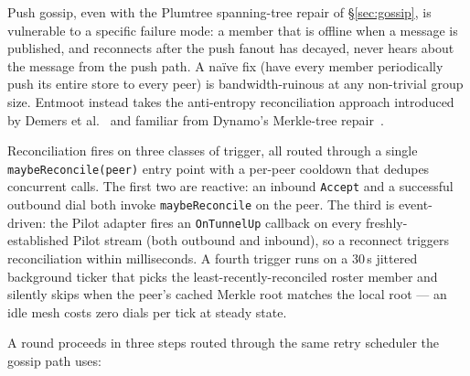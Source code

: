 \documentclass[11pt,a4paper,twocolumn]{article}
\begin{document}
Push gossip, even with the Plumtree spanning-tree repair of
\S\ref{sec:gossip}, is vulnerable to a specific failure mode: a
member that is offline when a message is published, and reconnects
after the push fanout has decayed, never hears about the message
from the push path. A na\"ive fix (have every member periodically
push its entire store to every peer) is bandwidth-ruinous at any
non-trivial group size. Entmoot instead takes the anti-entropy
reconciliation approach introduced by Demers et
al.~\citep{demers1987epidemic} and familiar from Dynamo's
Merkle-tree repair~\citep{decandia2007dynamo}.

Reconciliation fires on three classes of trigger, all routed through
a single \texttt{maybeReconcile(peer)} entry point with a per-peer
cooldown that dedupes concurrent calls. The first two are reactive:
an inbound \texttt{Accept} and a successful outbound dial both invoke
\texttt{maybeReconcile} on the peer. The third is event-driven: the
Pilot adapter fires an \texttt{OnTunnelUp} callback on every
freshly-established Pilot stream (both outbound and inbound), so a
reconnect triggers reconciliation within milliseconds. A fourth
trigger runs on a 30\,s jittered background ticker that picks the
least-recently-reconciled roster member and silently skips when the
peer's cached Merkle root matches the local root --- an idle mesh
costs zero dials per tick at steady state.

A round proceeds in three steps routed through the same retry
scheduler the gossip path uses:
\end{document}
